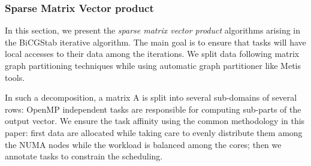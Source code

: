 \documentclass{Styles/llncs}
\begin{document}

\subsubsection{Sparse Matrix Vector product}

In this section, we present the \textit{sparse matrix vector product} algorithms arising in the BiCGStab iterative algorithm. The main goal is to ensure that tasks will have local accesses to their data among the iterations.
We split data following matrix graph partitioning techniques \cite{Saad:2003:IMS:829576} while using automatic graph partitioner like Metis~\cite{metis} tools.

In such a decomposition, a matrix A is split into several sub-domains of several rows: OpenMP independent tasks are responsible for computing sub-parts of the output vector. We ensure the task affinity using the common methodology in this paper: first data are allocated while taking care to evenly distribute them among the NUMA nodes while the workload is balanced among the cores; then we annotate tasks to constrain the scheduling.
\end{document}

